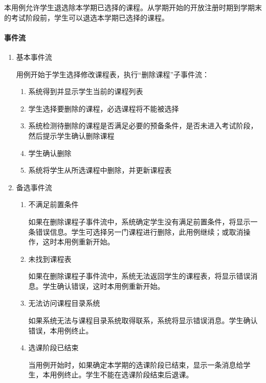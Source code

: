 本用例允许学生退选除本学期已选择的课程。从学期开始的开放注册时期到学期末的考试阶段前，学生可以退选本学期已选择的课程。
  
\paragraph{事件流}
  \begin{enumerate}
    \item 基本事件流
    
    用例开始于学生选择修改课程表，执行“删除课程”子事件流：
    \begin{enumerate}[(1)]
      \item 系统得到并显示学生当前的课程列表
      \item 学生选择要删除的课程，必选课程将不能被选择
      \item 系统检测待删除的课程是否满足必要的预备条件，是否未进入考试阶段，然后提示学生确认删除课程
      \item 学生确认删除
      \item 系统将学生从所选课程中删除，并更新课程表
    \end{enumerate}
    
    \item 备选事件流
    
    \begin{enumerate}[(1)]
      \item 不满足前置条件
      
      \CJKindent 如果在删除课程子事件流中，系统确定学生没有满足前置条件，将显示一条错误信息。学生可选择另一门课程进行删除，此用例继续；或取消操作，这时本用例重新开始。
      
      \item 未找到课程表
      
      \CJKindent 如果在删除课程子事件流中，系统无法返回学生的课程表，将显示错误消息。学生确认错误，这时本用例重新开始。

      \item 无法访问课程目录系统
      
      \CJKindent 如果系统无法与课程目录系统取得联系，系统将显示错误消息。学生确认错误，本用例终止。
      
      \item 选课阶段已结束
      
      \CJKindent 当用例开始时，如果确定本学期的选课阶段已结束，显示一条消息给学生，本用例终止。学生不能在选课阶段结束后退课。
    \end{enumerate}
  \end{enumerate}
  
